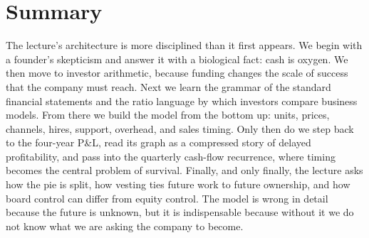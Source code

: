 \section{Summary}

The lecture's architecture is more disciplined than it first appears. We begin with a founder's skepticism and answer it with a biological fact: cash is oxygen. We then move to investor arithmetic, because funding changes the scale of success that the company must reach. Next we learn the grammar of the standard financial statements and the ratio language by which investors compare business models. From there we build the model from the bottom up: units, prices, channels, hires, support, overhead, and sales timing. Only then do we step back to the four-year P\&L, read its graph as a compressed story of delayed profitability, and pass into the quarterly cash-flow recurrence, where timing becomes the central problem of survival. Finally, and only finally, the lecture asks how the pie is split, how vesting ties future work to future ownership, and how board control can differ from equity control. The model is wrong in detail because the future is unknown, but it is indispensable because without it we do not know what we are asking the company to become.